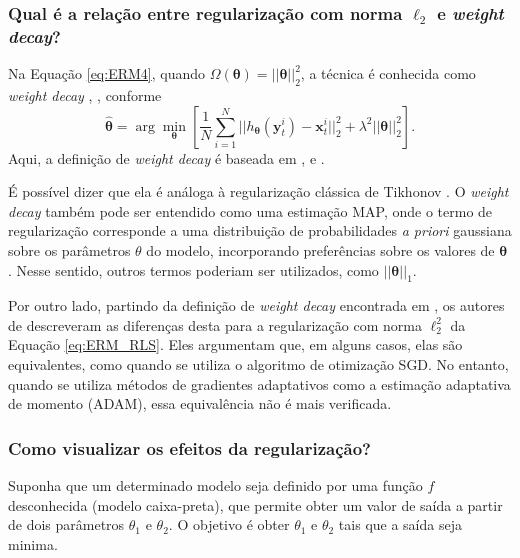 \subsubsection{Qual é a relação entre regularização com norma $\ell_2$ e \textit{weight decay}?}\label{sec:weight}

Na Equação \eqref{eq:ERM4}, quando $\Omega(\bm{\theta}) = \vert \vert \bm{\theta} \vert \vert^2_2$, a técnica é conhecida como \textit{weight decay} \cite[pág. 70]{cherkassky2007learning}, \cite{Krogh1991}, conforme
\begin{equation}
\hat{\bm{\theta}} = \arg\min\limits_{\bm{\theta}} \left[ \frac{1}{N} \sum_{i=1}^{N} \vert\vert h_{\bm{\theta}}(\mathbf{y}_t^{i}) - \mathbf{x}_t^{i} \vert\vert_2^2 + \lambda^2 \vert \vert \bm{\theta} \vert \vert^2_2 \right].
\label{eq:ERM_RLS}
\end{equation}
Aqui, a definição de \textit{weight decay} é baseada em \cite[Subseção 12.2]{Hinton1989}, \cite[Equação 1]{Krogh1991} e \cite[Subseção 8.2]{Vapnik1992}. 

É possível dizer que ela é análoga à regularização clássica de Tikhonov \cite{Chen2002}. O \textit{weight decay} também pode ser entendido como uma estimação MAP, onde o termo de regularização corresponde a uma distribuição de probabilidades \textit{a priori} gaussiana sobre os parâmetros $\theta$ do modelo, incorporando preferências sobre os valores de $\bm{\theta}$ \cite[pág. 505]{goodfellow2016deep}. Nesse sentido, outros termos poderiam ser utilizados, como $\vert \vert \bm{\theta} \vert \vert_1$.

Por outro lado, partindo da definição de \textit{weight decay} encontrada em \cite[Equação 3]{Hanson1988}, os autores de \cite{Loshchilov2018} descreveram as diferenças desta para a  regularização com norma $\ell_2^2$ da Equação \eqref{eq:ERM_RLS}. Eles argumentam que, em alguns casos, elas são equivalentes, como quando se utiliza o algoritmo de otimização SGD. No entanto, quando se utiliza métodos de gradientes adaptativos como a estimação adaptativa de momento (ADAM), essa equivalência não é mais verificada. 


 \subsubsection{Como visualizar os efeitos da regularização?}\label{sec:visualreg}
 
Suponha que um determinado modelo seja definido por uma função $f$ desconhecida (modelo  caixa-preta), que permite obter um valor de saída a partir de dois parâmetros $\theta_1$ e $\theta_2$. O objetivo é obter $\theta_1$ e $\theta_2$ tais que a saída seja minima. 

